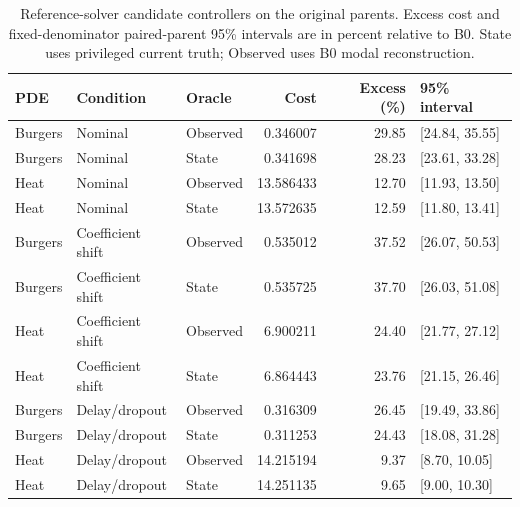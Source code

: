 \begin{table}[ht]
\caption{Reference-solver candidate controllers on the original parents. Excess cost and fixed-denominator paired-parent 95\% intervals are in percent relative to B0. State uses privileged current truth; Observed uses B0 modal reconstruction.}\label{tab:revision_oracles}
\centering\small
\begin{tabular}{@{}lllrrl@{}}\toprule
PDE & Condition & Oracle & Cost & Excess (\%) & 95\% interval\\\midrule
Burgers & Nominal & Observed & 0.346007 & 29.85 & [24.84, 35.55] \\
Burgers & Nominal & State & 0.341698 & 28.23 & [23.61, 33.28] \\
Heat & Nominal & Observed & 13.586433 & 12.70 & [11.93, 13.50] \\
Heat & Nominal & State & 13.572635 & 12.59 & [11.80, 13.41] \\
Burgers & Coefficient shift & Observed & 0.535012 & 37.52 & [26.07, 50.53] \\
Burgers & Coefficient shift & State & 0.535725 & 37.70 & [26.03, 51.08] \\
Heat & Coefficient shift & Observed & 6.900211 & 24.40 & [21.77, 27.12] \\
Heat & Coefficient shift & State & 6.864443 & 23.76 & [21.15, 26.46] \\
Burgers & Delay/dropout & Observed & 0.316309 & 26.45 & [19.49, 33.86] \\
Burgers & Delay/dropout & State & 0.311253 & 24.43 & [18.08, 31.28] \\
Heat & Delay/dropout & Observed & 14.215194 & 9.37 & [8.70, 10.05] \\
Heat & Delay/dropout & State & 14.251135 & 9.65 & [9.00, 10.30] \\
\bottomrule\end{tabular}
\end{table}
